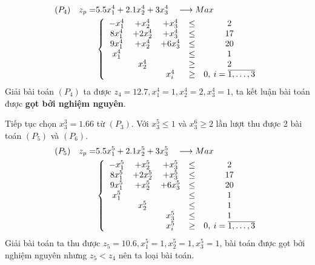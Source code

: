 \documentclass[12pt,a4paper]{report}
\begin{document}
    \begin{equation*}
      \begin{split}
          (P_4) \quad z_p= & 5.5x^4_1 + 2.1x^4_2 + 3x^4_3 \quad \longrightarrow Max \\
          & \left\{\begin{array} {ccccc}
           -x^4_1 &+ x^4_2 &+ x^4_3 &\leq& 2 \\
           8x^4_1 &+ 2x^4_2 &+ x^4_3&\leq& 17 \\
           9x^4_1 &+ x^4_2 &+ 6x^4_3 &\leq& 20 \\
           x^4_1 &&&\leq& 1 \\
           &x^4_2 &&\geq& 2 \\
          &&x^4_i &\geq& 0 , \: i=\overline{\rm 1, \ldots ,3} \\
          \end{array}\right. \\
      \end{split}
    \end{equation*}
    Giải bài toán $(P_4)$ ta được $z_4=12.7, x^4_1=1, x^4_2=2, x^4_3=1$, ta kết luận bài toán được  \textbf{gọt bởi nghiệm nguyên}.
    
    
    
    Tiếp tục chọn $x^3_3=1.66$ từ $(P_3)$. Với $x^5_3 \leq 1$ và $x^6_3 \geq 2$ lần lượt thu được 2 bài toán $(P_5)$ và $(P_6)$.
    \begin{equation*}
      \begin{split}
          (P_5) \quad z_p= & 5.5x^5_1 + 2.1x^5_2 + 3x^5_3 \quad \longrightarrow Max \\
          & \left\{\begin{array} {ccccc}
           -x^5_1&+ x^5_2 &+ x^5_3 &\leq& 2 \\
           8x^5_1 &+ 2x^5_2 &+ x^5_3&\leq& 17 \\
           9x^5_1 &+ x^5_2 &+ 6x^5_3 &\leq& 20 \\
           x^5_1 &&&\leq& 1 \\
           &x^5_2 &&\leq &1 \\
           &&x^5_3 &\leq& 1 \\
          &&x^5_i &\geq& 0 , \: i=\overline{\rm 1, \ldots ,3} \\
          \end{array}\right. \\
      \end{split}
    \end{equation*}
    Giải bài toán ta thu được $z_5=10.6, x^5_1=1, x^5_2=1, x^5_3=1$, bài toán được gọt bởi nghiệm nguyên nhưng $z_5<z_4$ nên ta loại bài toán.
    
\end{document}
